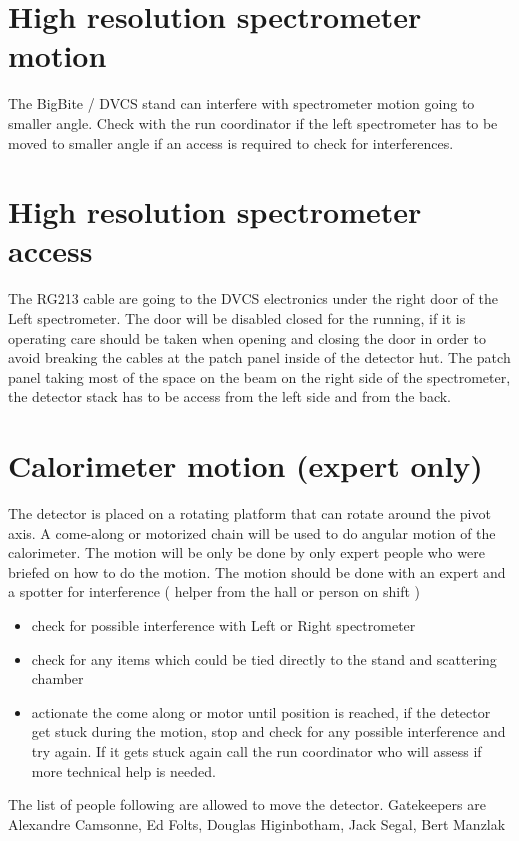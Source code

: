 \documentclass{article}
\begin{document}
\section{High resolution spectrometer motion}
The BigBite / DVCS stand can interfere with spectrometer motion going to smaller angle. Check with the run coordinator if the left spectrometer has to be moved to smaller angle if an access is required to check for interferences.


\section{High resolution spectrometer access}
The RG213 cable are going to the DVCS electronics under the right door of the Left spectrometer. The door will be disabled closed for the running, if it is operating care should be taken when opening and closing the door in order to avoid breaking the cables at the patch panel inside of the detector hut.
The patch panel taking most of the space on the beam on the right side of the spectrometer, the detector stack has to be access from the left side and from the back.

\section{Calorimeter motion (expert only)}
The detector is placed on a rotating platform that can rotate around the pivot axis. A come-along or motorized chain will be used to do angular motion of the calorimeter. The motion will be only be done by only expert people who were briefed on how to do the motion. The motion should be done with an expert and a spotter for interference ( helper from the hall or person on shift )
\begin{itemize}
\item check for possible interference with Left or Right spectrometer
\item check for any items which could be tied directly to the stand and scattering chamber
\item actionate the come along or motor until position is reached, if the detector get stuck during the motion, stop and check for any possible interference and try again. If it gets stuck again call the run coordinator who will assess if more technical help is needed.
\end{itemize}

The list of people following are allowed to move the detector.
Gatekeepers are Alexandre Camsonne, Ed Folts, Douglas Higinbotham, Jack Segal, Bert Manzlak 
\end{document}

